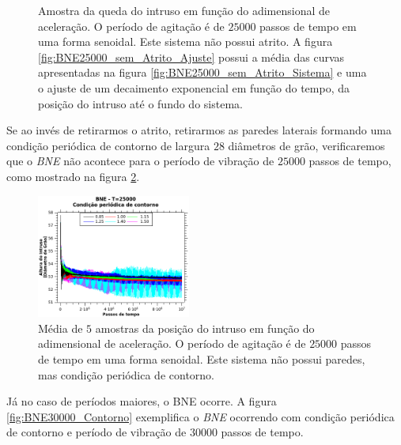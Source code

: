 \begin{figure}
\begin{minipage}{.45\linewidth}
        \label{fig:BNE25000_sem_Atrito_Ajuste}
    \end{minipage}
    \caption{Amostra da queda do intruso em função do adimensional de aceleração. O período de agitação é de $25000$ passos de tempo em uma forma senoidal. Este sistema não possui atrito. A figura \ref{fig:BNE25000_sem_Atrito_Ajuste} possui a média das curvas apresentadas na figura \ref{fig:BNE25000_sem_Atrito_Sistema} e uma o ajuste de um decaimento exponencial em função do tempo, da posição do intruso até o fundo do sistema.}
    \label{fig:BNE25000_sem_Atrito}
\end{figure}

    Se ao invés de retirarmos o atrito, retirarmos as paredes laterais formando uma condição periódica de contorno de largura $28$ diâmetros de grão, verificaremos que o \textit{BNE} não acontece para o período de vibração de $25000$ passos de tempo, como mostrado na figura \ref{fig:BNE25000_Contorno}.

\begin{figure}
    \centering
    \includegraphics[width=0.45\textwidth]{04-figuras/BNE25000Contorno.png}
    \caption{Média de $5$ amostras da posição do intruso em função do adimensional de aceleração. O período de agitação é de $25000$ passos de tempo em uma forma senoidal. Este sistema não possui paredes, mas condição periódica de contorno.}
    \label{fig:BNE25000_Contorno}
\end{figure}

    Já no caso de períodos maiores, o BNE ocorre. A figura \ref{fig:BNE30000_Contorno} exemplifica o \textit{BNE} ocorrendo com condição periódica de contorno e período de vibração de $30000$ passos de tempo.

